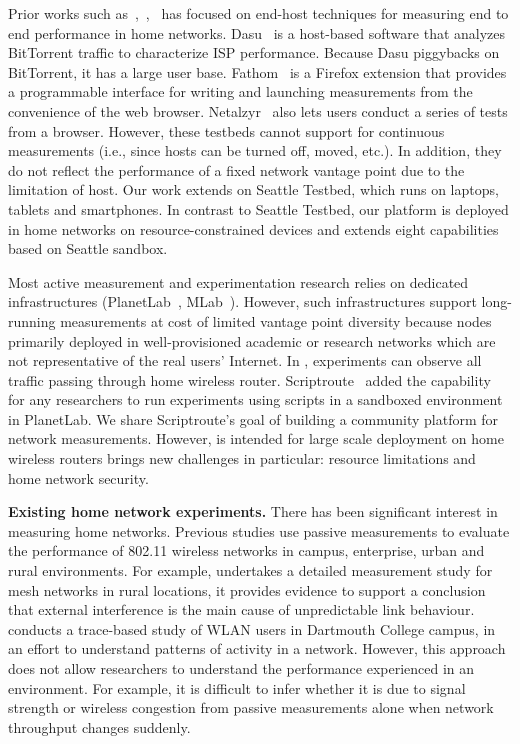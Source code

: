 Prior works such as~\cite{sanchez2014measurement},~\cite{dhawan2012fathom},~\cite{kreibich2010netalyzr} has focused on end-host techniques for measuring end to end performance in home networks. Dasu~\cite{sanchez2014measurement} is a host-based software that analyzes BitTorrent traffic to characterize ISP performance. Because Dasu piggybacks on BitTorrent, it has a large user base. Fathom~\cite{dhawan2012fathom} is a Firefox extension that provides a programmable interface for writing and launching measurements from the convenience of the web browser. Netalzyr~\cite{kreibich2010netalyzr} also lets users conduct a series of tests from a browser. However, these testbeds cannot support for continuous measurements (i.e., since hosts can be turned off, moved, etc.). In addition, they do not reflect the performance of a fixed network vantage point due to the limitation of host. Our work extends on Seattle Testbed\cite{cappos2009seattle}, which runs on laptops, tablets and smartphones. In contrast to Seattle Testbed, our platform is deployed in home networks on resource-constrained devices and extends eight capabilities based on Seattle sandbox.

Most active measurement and experimentation research relies on dedicated infrastructures (PlanetLab~\cite{chun2003planetlab}, MLab~\cite{mlab}). However, such infrastructures support long-running measurements at cost of limited vantage point diversity because nodes primarily deployed in well-provisioned academic or research networks which are not representative of the real users' Internet. In \sysname, experiments can observe all traffic passing through home wireless router. Scriptroute~\cite{spring2003scriptroute} added the capability for any researchers to run experiments using scripts in a sandboxed environment in PlanetLab. We share Scriptroute's goal of building a community platform for network measurements. However, \sysname is intended for large scale deployment on home wireless routers brings new challenges in particular: resource limitations and home network security.

\textbf{Existing home network experiments.} There has been significant interest in measuring home networks. Previous studies\cite{aguayo2004link}\cite{kotz2005analysis}\cite{raman2009feasibility} use passive measurements to evaluate the performance of 802.11 wireless networks in campus, enterprise, urban and rural environments. For example, \cite{raman2009feasibility} undertakes a detailed measurement study for mesh networks in rural locations, it provides evidence to support a conclusion that external interference is the main cause of unpredictable link behaviour. \cite{kotz2005analysis} conducts a trace-based study of WLAN users in Dartmouth College campus, in an effort to understand patterns of activity in a network. However, this approach does not allow researchers to understand the performance experienced in an environment. For example, it is difficult to infer whether it is due to signal strength or wireless congestion from passive measurements alone when network throughput changes suddenly.

